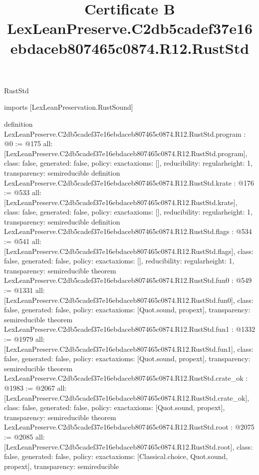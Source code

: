 \begin{lexlean}{RustStd}
\title{Certificate B LexLeanPreserve.C2db5cadef37e16ebdaceb807465c0874.R12.RustStd}
\begin{coremodule}
imports [LexLeanPreservation.RustSound]

definition LexLeanPreserve.C2db5cadef37e16ebdaceb807465c0874.R12.RustStd.program : @0 := @175 {
  all: [LexLeanPreserve.C2db5cadef37e16ebdaceb807465c0874.R12.RustStd.program],
  class: false,
  generated: false,
  policy: exact{axioms: []},
  reducibility: regular{height: 1},
  transparency: semireducible
}
definition LexLeanPreserve.C2db5cadef37e16ebdaceb807465c0874.R12.RustStd.krate : @176 := @533 {
  all: [LexLeanPreserve.C2db5cadef37e16ebdaceb807465c0874.R12.RustStd.krate],
  class: false,
  generated: false,
  policy: exact{axioms: []},
  reducibility: regular{height: 1},
  transparency: semireducible
}
definition LexLeanPreserve.C2db5cadef37e16ebdaceb807465c0874.R12.RustStd.flags : @534 := @541 {
  all: [LexLeanPreserve.C2db5cadef37e16ebdaceb807465c0874.R12.RustStd.flags],
  class: false,
  generated: false,
  policy: exact{axioms: []},
  reducibility: regular{height: 1},
  transparency: semireducible
}
theorem LexLeanPreserve.C2db5cadef37e16ebdaceb807465c0874.R12.RustStd.fun0 : @549 := @1331 {
  all: [LexLeanPreserve.C2db5cadef37e16ebdaceb807465c0874.R12.RustStd.fun0],
  class: false,
  generated: false,
  policy: exact{axioms: [Quot.sound, propext]},
  transparency: semireducible
}
theorem LexLeanPreserve.C2db5cadef37e16ebdaceb807465c0874.R12.RustStd.fun1 : @1332 := @1979 {
  all: [LexLeanPreserve.C2db5cadef37e16ebdaceb807465c0874.R12.RustStd.fun1],
  class: false,
  generated: false,
  policy: exact{axioms: [Quot.sound, propext]},
  transparency: semireducible
}
theorem LexLeanPreserve.C2db5cadef37e16ebdaceb807465c0874.R12.RustStd.crate_ok : @1983 := @2067 {
  all: [LexLeanPreserve.C2db5cadef37e16ebdaceb807465c0874.R12.RustStd.crate_ok],
  class: false,
  generated: false,
  policy: exact{axioms: [Quot.sound, propext]},
  transparency: semireducible
}
theorem LexLeanPreserve.C2db5cadef37e16ebdaceb807465c0874.R12.RustStd.root : @2075 := @2085 {
  all: [LexLeanPreserve.C2db5cadef37e16ebdaceb807465c0874.R12.RustStd.root],
  class: false,
  generated: false,
  policy: exact{axioms: [Classical.choice, Quot.sound, propext]},
  transparency: semireducible
}


\end{coremodule}
\end{lexlean}
